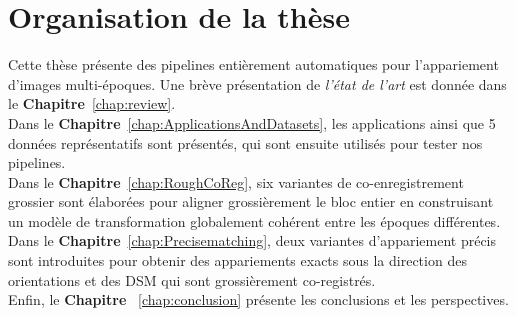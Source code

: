 \section{Organisation de la thèse}
Cette thèse présente des pipelines entièrement automatiques pour l'appariement d'images multi-époques. 
Une brève présentation de \textit{l'état de l'art} est donnée dans le \textbf{Chapitre}~\ref{chap:review}.\\

Dans le \textbf{Chapitre}~\ref{chap:ApplicationsAndDatasets}, les applications ainsi que 5 données représentatifs sont présentés, qui sont ensuite utilisés pour tester nos pipelines.\\

Dans le \textbf{Chapitre}~\ref{chap:RoughCoReg}, six variantes de co-enregistrement grossier sont élaborées pour aligner grossièrement le bloc entier en construisant un modèle de transformation globalement cohérent entre les époques différentes.\\

Dans le \textbf{Chapitre}~\ref{chap:Precisematching}, deux variantes d'appariement précis sont introduites pour obtenir des appariements exacts sous la direction des orientations et des \ac{DSM} qui sont grossièrement co-registrés.\\

Enfin, le \textbf{Chapitre} ~\ref{chap:conclusion} présente les conclusions et les perspectives.\\
